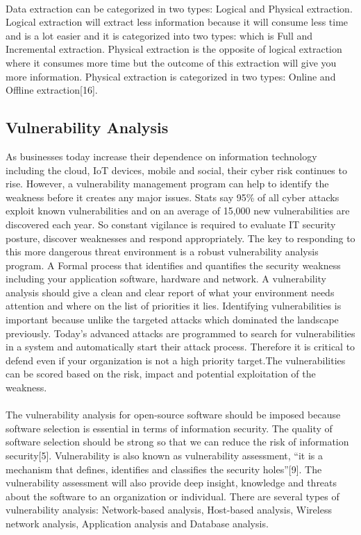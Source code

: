 \paragraph{}
Data extraction can be categorized in two types: Logical and Physical extraction. Logical extraction will extract less information because it will consume less time and is a lot easier and it is categorized into two types: which is Full and Incremental extraction. Physical extraction is the opposite of logical extraction where it consumes more time but the outcome of this extraction will give you more information. Physical extraction is categorized in two types: Online and Offline extraction[16].
%
\subsection{Vulnerability Analysis}
As businesses today increase their dependence on information technology including the cloud, IoT devices, mobile and social, their cyber risk continues to rise. However, a vulnerability management program can help to identify the weakness before it creates any major issues. Stats say 95\% of all cyber attacks exploit known vulnerabilities and on an average of 15,000 new vulnerabilities are discovered each year. So constant vigilance is required to evaluate IT security posture, discover weaknesses and respond appropriately. The key to responding to this more dangerous threat environment is a robust vulnerability analysis program. A Formal process that identifies and quantifies the security weakness including your application software, hardware and network. A vulnerability analysis should give a clean and clear report of what your environment needs attention and where on the list of priorities it lies. Identifying vulnerabilities is important  because unlike the targeted attacks which dominated the landscape previously. Today’s advanced attacks are programmed to search for vulnerabilities in a system and automatically start their attack process. Therefore it is critical to defend even if your organization is not a high priority target.The vulnerabilities can be scored based on the risk, impact and potential exploitation of the weakness.
\paragraph{}
The vulnerability analysis for open-source software should be imposed because software selection is essential in terms of information security. The quality of software selection should be strong so that we can reduce the risk of information security[5]. Vulnerability is also known as vulnerability assessment, “it is a mechanism that defines, identifies and classifies the security holes”[9]. The vulnerability assessment will also provide deep insight, knowledge and threats about the software to an organization or individual. There are several types of vulnerability analysis: Network-based analysis, Host-based analysis, Wireless network analysis, Application analysis and Database analysis.
